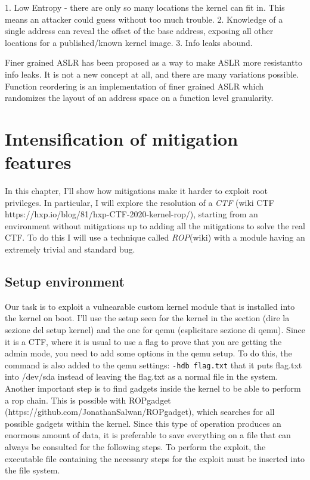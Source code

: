 \documentclass{masterthesis}
\begin{document}
1. Low Entropy - there are only so many locations the kernel can fit in. This means an attacker could guess without too much trouble.
2. Knowledge of a single address can reveal the offset of the base address, exposing all other locations for a published/known kernel image.
3. Info leaks abound.

Finer grained ASLR has been proposed as a way to make ASLR more resistantto info leaks. It is not a new concept at all, and there are many variations possible. Function reordering is an implementation of finer grained ASLR which randomizes the layout of an address space on a function level granularity.

\chapter{Intensification of mitigation features}
\label{ch:adding mitigation}
In this chapter, I'll show how mitigations make it harder to exploit root privileges.
In particular, I will explore the resolution of a \emph{CTF} (wiki CTF https://hxp.io/blog/81/hxp-CTF-2020-kernel-rop/), starting from an environment without mitigations up to adding all the mitigations to solve the real CTF.
To do this I will use a technique called \emph{ROP}(wiki) with a module having an extremely trivial and standard bug.
\section{Setup environment}
Our task is to exploit a vulnearable custom kernel module that is installed into the kernel on boot.
I'll use the setup seen for the kernel in the section (dire la sezione del setup kernel) and the one for qemu (esplicitare sezione di qemu).
Since it is a CTF, where it is usual to use a flag to prove that you are getting the admin mode, you need to add some options in the qemu setup.
To do this, the command is also added to the qemu settings:
\lstinline{-hdb flag.txt}
that it puts flag.txt into /dev/sda instead of leaving the flag.txt as a normal file in the system. 
Another important step is to find gadgets inside the kernel to be able to perform a rop chain.
This is possible with ROPgadget (https://github.com/JonathanSalwan/ROPgadget), which searches for all possible gadgets within the kernel.
Since this type of operation produces an enormous amount of data, it is preferable to save everything on a file that can always be consulted for the following steps.
To perform the exploit, the executable file containing the necessary steps for the exploit must be inserted into the file system.
\end{document}
